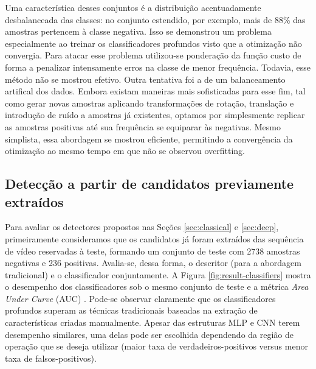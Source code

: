     Uma característica desses conjuntos é a distribuição acentuadamente desbalanceada das classes: no conjunto estendido, por exemplo, mais de 88\% das amostras pertencem à classe negativa. Isso se demonstrou um problema especialmente ao treinar os classificadores profundos visto que a otimização não convergia. Para atacar esse problema utilizou-se ponderação da função custo de forma a penalizar intensamente erros na classe de menor frequência. Todavia, esse método não se mostrou efetivo. Outra tentativa foi a de um balanceamento artifical dos dados. Embora existam maneiras mais sofisticadas para esse fim, tal como gerar novas amostras aplicando transformações de rotação, translação e introdução de ruído a amostras já existentes, optamos por simplesmente replicar as amostras positivas até sua frequência se equiparar às negativas. Mesmo simplista, essa abordagem se mostrou eficiente, permitindo a convergência da otimização ao mesmo tempo em que não se observou overfitting.

\subsection{Detecção a partir de candidatos previamente extraídos}
    Para avaliar os detectores propostos nas Seções \ref{sec:classical} e \ref{sec:deep}, primeiramente consideramos que os candidatos já foram extraídos das sequência de vídeo reservadas à teste, formando um conjunto de teste com 2738 amostras negativas e 236 positivas. Avalia-se, dessa forma, o descritor (para a abordagem tradicional) e o classificador conjuntamente. A Figura \ref{fig:result-classifiers} mostra o desempenho dos classificadores sob o mesmo conjunto de teste e a métrica \textit{Area Under Curve} (AUC) \cite{evaluationMetrics}. Pode-se observar claramente que os classificadores profundos superam as técnicas tradicionais baseadas na extração de características criadas manualmente. Apesar das estruturas MLP e CNN terem desempenho similares, uma delas pode ser escolhida dependendo da região de operação que se deseja utilizar (maior taxa de verdadeiros-positivos versus menor taxa de falsos-positivos).

    \begin{figure*}[!t]
    \centering
    \label{fig:result-classifiers-all}
    \hfil
    \label{fig:result-classifiers-all-zoom}
    \caption{Desempenho dos classificadores.}
    \label{fig:result-classifiers}
    \end{figure*}


